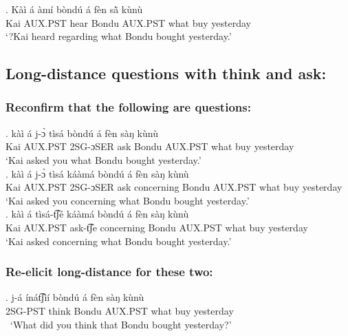 \documentclass{assets/fieldnotes}
\begin{document}
\exg.  Kàì á àmí bòndú á fèn sã̀  kùnù\\
Kai AUX.PST hear Bondu AUX.PST what buy yesterday\\
`?Kai heard regarding what Bondu bought yesterday.' \\


\subsection{Long-distance questions with think and ask:}

\subsubsection{Reconfirm that the following are questions:}

\exg. kàì á j-ɔ̀ tìsá bòndú á fèn sàŋ kùnù\\
Kai AUX.PST 2SG-ɔSER ask Bondu AUX.PST what buy yesterday\\
`Kai asked you what Bondu bought yesterday.' \\  


\exg. kàì á j-ɔ̀ tìsá káàmá bòndú á fèn sàŋ kùnù\\
Kai AUX.PST 2SG-ɔSER ask concerning Bondu AUX.PST what buy yesterday\\
`Kai asked you concerning what Bondu bought yesterday.' \\

\exg. kàì á tìsá-t͡ʃé káàmá bòndú á fèn sàŋ kùnù\\
Kai AUX.PST ask-t͡ʃe concerning Bondu AUX.PST what buy yesterday\\
`Kai asked concerning what Bondu bought yesterday.' \\



\subsubsection{Re-elicit long-distance for these two:}

\exg. j-á ínát͡ʃìí bòndú á fèn sàŋ kùnù \\
2SG-PST think Bondu AUX.PST what buy yesterday\\\
`What did you think that Bondu bought yesterday?' \\  
\end{document}
